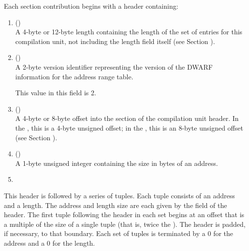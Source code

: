 Each 
\bb
\dotdebugaranges{} section contribution
begins with a header containing:
\eb
\begin{enumerate}[1. ]

\item \HFNunitlength{} () \\
A 4-byte or 12-byte length containing the length of the
set of entries for this compilation unit, not including the
length field itself
\bb
(see Section ).
\eb

\item \HFNversion{} (\HFTuhalf) \\
A 2-byte version identifier representing the version of the
DWARF information for the address range table.

This value in this field  is 2. 
 
\item \HFNdebuginfooffset{} () \\
A 
4-byte or 8-byte offset into the 
\dotdebuginfo{} section of
the compilation unit header. In the \thirtytwobitdwarfformat,
this is a 4-byte unsigned offset; in the \sixtyfourbitdwarfformat,
this is an 8-byte unsigned offset 
(see Section ).

\item \HFNaddresssize{} (\HFTubyte) \\
A 1-byte unsigned integer containing the size in bytes of an
address. 
\db

\item \HFNreservedwassegmentselectorsize{} 
\bbeb
\\

\end{enumerate}

This header is followed by a series of tuples. Each tuple
consists of 
\bb
an address and a length. The
address and length size are each given by the \HFNaddresssize{}
field of the header. 
The first tuple following the header in
each set begins at an offset that is a multiple of the size
of a single tuple (that is, 
\eb
twice the ). 
The header is padded, if necessary, to that boundary. 
Each set of tuples is terminated by 
\db
a 0 for the address and a 0 for the length. 
\db


